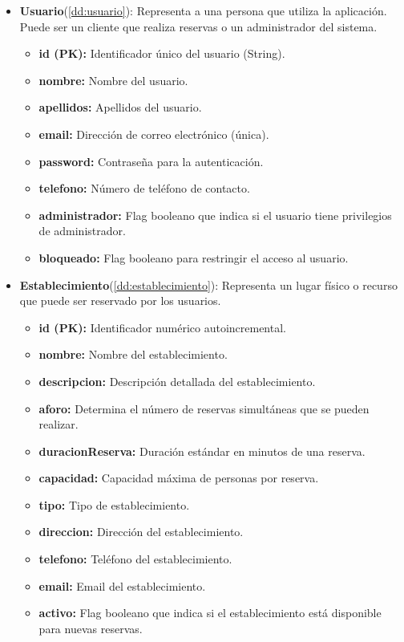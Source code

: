 \begin{itemize}
	\item \textbf{Usuario}(\ref{dd:usuario}): Representa a una persona que utiliza la aplicación. Puede ser un cliente que realiza reservas o un administrador del sistema.
	\begin{itemize}
       \item \textbf{id (PK):} Identificador único del usuario (String).
       \item \textbf{nombre:} Nombre del usuario.
       \item \textbf{apellidos:} Apellidos del usuario.
       \item \textbf{email:} Dirección de correo electrónico (única).
       \item \textbf{password:} Contraseña para la autenticación.
       \item \textbf{telefono:} Número de teléfono de contacto.
       \item \textbf{administrador:} Flag booleano que indica si el usuario tiene privilegios de administrador.
       \item \textbf{bloqueado:} Flag booleano para restringir el acceso al usuario.
	\end{itemize}
\end{itemize}

\begin{itemize}
	\item \textbf{Establecimiento}(\ref{dd:establecimiento}): Representa un lugar físico o recurso que puede ser reservado por los usuarios.
	\begin{itemize}
       \item \textbf{id (PK):} Identificador numérico autoincremental.
       \item \textbf{nombre:} Nombre del establecimiento.
       \item \textbf{descripcion:} Descripción detallada del establecimiento.
       \item \textbf{aforo:} Determina el número de reservas simultáneas que se pueden realizar.
       \item \textbf{duracionReserva:} Duración estándar en minutos de una reserva.
       \item \textbf{capacidad:} Capacidad máxima de personas por reserva.
       \item \textbf{tipo:} Tipo de establecimiento.
       \item \textbf{direccion:} Dirección del establecimiento.
       \item \textbf{telefono:} Teléfono del establecimiento.
       \item \textbf{email:} Email del establecimiento.
       \item \textbf{activo:} Flag booleano que indica si el establecimiento está disponible para nuevas reservas.
	\end{itemize}
\end{itemize}

